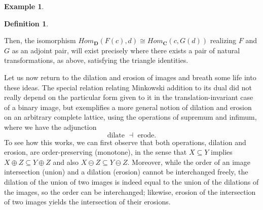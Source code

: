 \documentclass[11pt]{book}
\theoremstyle{definition}
\newtheorem{example}{Example}[section]
\theoremstyle{definition}
\newtheorem{definition}{Definition}[section]
\theoremstyle{definition}
\theoremstyle{theorem}
\theoremstyle{definition}
\begin{document}
\begin{example}
\begin{definition}
	\begin{center}
	\end{center}  
\end{definition} \noindent 
Then, the isomorphism $Hom_{\textbf{D}}(F(c), d) \cong Hom_{\textbf{C}}(c, G(d))$ realizing $F$ and $G$ as an adjoint pair, will exist precisely where there exists a pair of natural transformations, as above, satisfying the triangle identities.\par \vspace*{1em} 
	Let us now return to the dilation and erosion of images and breath some life into these ideas. The special relation relating Minkowski addition to its dual did not really depend on the particular form given to it in the translation-invariant case of a binary image, but exemplifies a more general notion of dilation and erosion on an arbitrary complete lattice, using the operations of supremum and infimum, where we have the adjunction
	\begin{equation*}
	\text{dilate } \dashv \text{ erode}. 
	\end{equation*}
	 To see how this works, we can first observe that both operations, dilation and erosion, are order-preserving (monotone), in the sense that $X \subseteq  Y$ implies $X \oplus Z \subseteq  Y \oplus Z$ and also $X \ominus Z \subseteq  Y \ominus Z$. Moreover, while the order of an image intersection (union) and a dilation (erosion) cannot be interchanged freely, the dilation of the union of two images is indeed equal to the union of the dilations of the images, so the order can be interchanged; likewise, erosion of the intersection of two images yields the intersection of their erosions. \par 

\end{example}
\end{document}

